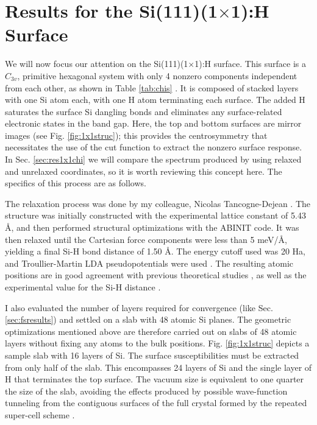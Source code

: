 
\section{Results for the \texorpdfstring{Si(111)(1$\times$1):H}{Si(111)(1x1):H}
Surface}\label{sec:Si1x1results}

We will now focus our attention on the Si(111)(1$\times$1):H surface. This
surface is a $C_{3v}$, primitive hexagonal system with only 4 nonzero components
independent from each other, as shown in Table \ref{tab:chis} \cite{popovbook,
sipePRB87, mizrahiJOSA88}. It is composed of stacked layers with one Si atom
each, with one H atom terminating each surface. The added H saturates the
surface Si dangling bonds and eliminates any surface-related electronic states
in the band gap. Here, the top and bottom surfaces are mirror images (see Fig.
\ref{fig:1x1struc}); this provides the centrosymmetry that necessitates the use
of the cut function to extract the nonzero surface response. In Sec.
\ref{sec:res1x1chi} we will compare the spectrum produced by using relaxed and
unrelaxed coordinates, so it is worth reviewing this concept here. The specifics
of this process are as follows.

The relaxation process was done by my colleague, Nicolas Tancogne-Dejean
\cite{tancognedejean:tel-01235611}. The structure was initially constructed with
the experimental lattice constant of 5.43 \AA, and then performed structural
optimizations with the ABINIT \cite{gonzeCPS09, abinit} code. It was then
relaxed until the Cartesian force components were less than 5 meV/\AA, yielding
a final Si-H bond distance of 1.50 \AA. The energy cutoff used was 20 Ha, and
Troullier-Martin LDA pseudopotentials were used \cite{troullierPRB91}. The
resulting atomic positions are in good agreement with previous theoretical
studies \cite{kaxirasPRB88, jonaPRB95, alfonsoPRB96, cargnoniJOCP00,
mejiaPRB02}, as well as the experimental value for the Si-H distance
\cite{weastCRC88}.

I also evaluated the number of layers required for convergence (like Sec.
\ref{sec:fsresults}) and settled on a slab with 48 atomic Si planes. The
geometric optimizations mentioned above are therefore carried out on slabs of 48
atomic layers without fixing any atoms to the bulk positions. Fig.
\ref{fig:1x1struc} depicts a sample slab with 16 layers of Si. The surface
susceptibilities must be extracted from only half of the slab. This encompasses
24 layers of Si and the single layer of H that terminates the top surface. The
vacuum size is equivalent to one quarter the size of the slab, avoiding the
effects produced by possible wave-function tunneling from the contiguous
surfaces of the full crystal formed by the repeated super-cell scheme
\cite{mendozaPRB06}.


